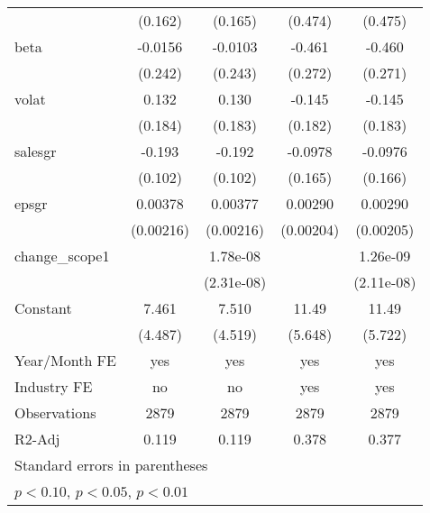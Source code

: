 \begin{table}[htbp]
\begin{tabular}{l*{4}{c}}
                    &     (0.162)         &     (0.165)         &     (0.474)         &     (0.475)         \\
[1em]
beta                &     -0.0156         &     -0.0103         &      -0.461\sym{*}  &      -0.460\sym{*}  \\
                    &     (0.242)         &     (0.243)         &     (0.272)         &     (0.271)         \\
[1em]
volat               &       0.132         &       0.130         &      -0.145         &      -0.145         \\
                    &     (0.184)         &     (0.183)         &     (0.182)         &     (0.183)         \\
[1em]
salesgr             &      -0.193\sym{*}  &      -0.192\sym{*}  &     -0.0978         &     -0.0976         \\
                    &     (0.102)         &     (0.102)         &     (0.165)         &     (0.166)         \\
[1em]
epsgr               &     0.00378\sym{*}  &     0.00377\sym{*}  &     0.00290         &     0.00290         \\
                    &   (0.00216)         &   (0.00216)         &   (0.00204)         &   (0.00205)         \\
[1em]
change\_scope1       &                     &    1.78e-08         &                     &    1.26e-09         \\
                    &                     &  (2.31e-08)         &                     &  (2.11e-08)         \\
[1em]
Constant            &       7.461         &       7.510         &       11.49\sym{**} &       11.49\sym{**} \\
                    &     (4.487)         &     (4.519)         &     (5.648)         &     (5.722)         \\
\hline
Year/Month FE       &         yes         &         yes         &         yes         &         yes         \\
Industry FE         &          no         &          no         &         yes         &         yes         \\
Observations        &        2879         &        2879         &        2879         &        2879         \\
R2-Adj              &       0.119         &       0.119         &       0.378         &       0.377         \\
\hline\hline
\multicolumn{5}{l}{\footnotesize Standard errors in parentheses}\\
\multicolumn{5}{l}{\footnotesize \sym{*} \(p<0.10\), \sym{**} \(p<0.05\), \sym{***} \(p<0.01\)}\\
\end{tabular}
\end{table}
